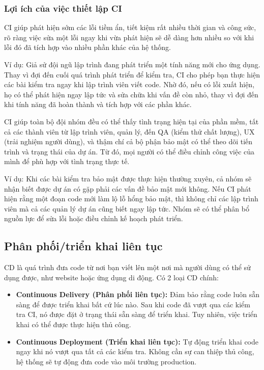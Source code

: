 \documentclass[12pt,a4paper,oneside]{extreport}
\begin{document}
\subsubsection{Lợi ích của việc thiết lập CI}
CI giúp phát hiện sớm các lỗi tiềm ẩn, tiết kiệm rất nhiều thời gian và công
sức, rõ ràng việc sửa một lỗi ngay khi vừa phát hiện sẽ dễ dàng hơn nhiều so
với khi lỗi đó đã tích hợp vào nhiều phần khác của hệ thống.

Ví dụ: Giả sử đội ngũ lập trình đang phát triển một tính năng mới cho ứng dụng.
Thay vì đợi đến cuối quá trình phát triển để kiểm tra, CI cho phép bạn thực
hiện các bài kiểm tra ngay khi lập trình viên viết code. Nhờ đó, nếu có lỗi
xuất hiện, họ có thể phát hiện ngay lập tức và sửa chữa khi vấn đề còn nhỏ,
thay vì đợi đến khi tính năng đã hoàn thành và tích hợp với các phần khác.

CI giúp toàn bộ đội nhóm đều có thể thấy tình trạng hiện tại của phần mềm, tất
cả các thành viên từ lập trình viên, quản lý, đến QA (kiểm thử chất lượng), UX
(trải nghiệm người dùng), và thậm chí cả bộ phận bảo mật có thể theo dõi tiến
trình và trạng thái của dự án. Từ đó, mọi người có thể điều chỉnh công việc của
mình để phù hợp với tình trạng thực tế.

Ví dụ: Khi các bài kiểm tra bảo mật được thực hiện thường xuyên, cả nhóm sẽ
nhận biết được dự án có gặp phải các vấn đề bảo mật mới không. Nếu CI phát hiện
rằng một đoạn code mới làm lộ lỗ hổng bảo mật, thì không chỉ các lập trình viên
mà cả các quản lý dự án cũng biết ngay lập tức. Nhóm sẽ có thể phân bổ nguồn
lực để sửa lỗi hoặc điều chỉnh kế hoạch phát triển.

\subsection{Phân phối/triển khai liên tục}
CD là quá trình đưa code từ nơi bạn viết lên một nơi mà người dùng có thể sử
dụng được, như website hoặc ứng dụng di động. Có 2 loại CD chính:
\begin{itemize}
  \item \textbf{Continuous Delivery (Phân phối liên tục):} Đảm bảo rằng code
  luôn sẵn sàng để được triển khai bất cứ lúc nào. Sau khi code đã vượt qua các
  kiểm tra CI, nó được đặt ở trạng thái sẵn sàng để triển khai. Tuy nhiên, việc
  triển khai có thể được thực hiện thủ công.
  \item \textbf{Continuous Deployment (Triển khai liên tục):} Tự động triển khai
  code ngay khi nó vượt qua tất cả các kiểm tra. Không cần sự can thiệp thủ
  công, hệ thống sẽ tự động đưa code vào môi trường production.
\end{itemize}
\end{document}
